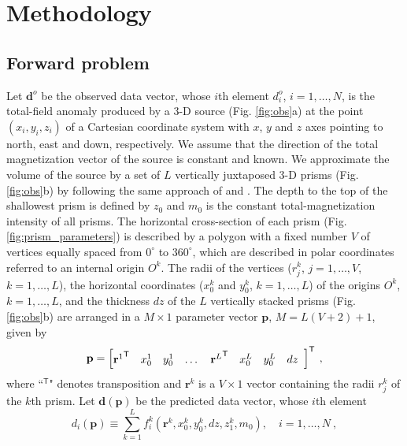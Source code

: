 \section{Methodology}\label{sec:metodo}

\subsection{Forward problem}

Let $\mathbf{d}^{o}$ be the observed data vector, whose $i$th element $d^{o}_{i}$, $i = 1, \dots, N$, is the total-field anomaly produced by a 3-D source (Fig. \ref{fig:obs}a) at the point $(x_{i}, y_{i}, z_{i})$ of a Cartesian coordinate system with $x$, $y$ and $z$ axes pointing to north, east and down, respectively. We assume that the direction of the total magnetization vector of the source is constant and known. We approximate the volume of the source by a set of $L$ vertically juxtaposed 3-D prisms (Fig. \ref{fig:obs}b) by following the same approach of \cite{oliveirajr-etal2011} and \cite{oliveirajr-barbosa2013}. The depth to the top of the shallowest prism is defined by $z_{0}$ and $m_{0}$ is the constant total-magnetization intensity of all prisms. The horizontal cross-section of each prism (Fig. \ref{fig:prism_parameters}) 
is described by a polygon with a fixed number $V$ of vertices equally spaced from $0^{\circ}$ to $360^{\circ}$, which are described in polar coordinates referred to an internal origin $O^{k}$. The radii of the vertices ($r^{k}_{j}$, $j=1,\dots , V$, $k=1,\dots ,L$), the horizontal coordinates ($x_{0}^{k}$ and $y_{0}^{k}$, $k=1,\dots ,L$) of the origins $O^{k}$, $k=1,\dots ,L$, and the thickness $dz$ of the $L$ vertically stacked prisms (Fig. \ref{fig:obs}b) are arranged in a $M \times 1$ parameter vector $\mathbf{p}$, $M = L (V + 2) + 1$, given by
\begin{equation}
\mathbf{p} = \left[ \begin{array}{@{}*{12}{c}@{}}
{\mathbf{r}^{1}}^{\mathsf{T}} & x_{0}^{1} & y_{0}^{1} & \dots & {\mathbf{r}^{L}}^{\mathsf{T}} & x_{0}^{L} & y_{0}^{L} & dz \\
\end{array} \right]^{\mathsf{T}} \: ,
\label{eq:p-vector}
\end{equation}
where ``$^{\mathsf{T}}$" denotes transposition and $\mathbf{r}^{k}$ is a $V \times 1$ vector containing the radii $r^{k}_{j}$ 
of the $k$th prism.
Let $\mathbf{d} (\mathbf{p})$ be the predicted data vector, whose $i$th element 
\begin{equation}
d_{i} (\mathbf{p}) \equiv \sum\limits_{k=1}^{L} f_{i}^{k}(\mathbf{r}^{k}, x_{0}^{k}, y_{0}^{k}, dz, z_{1}^{k}, m_{0}), \quad i = 1, \dots, N \: ,
\label{eq:predicted-data-i}
\end{equation}
